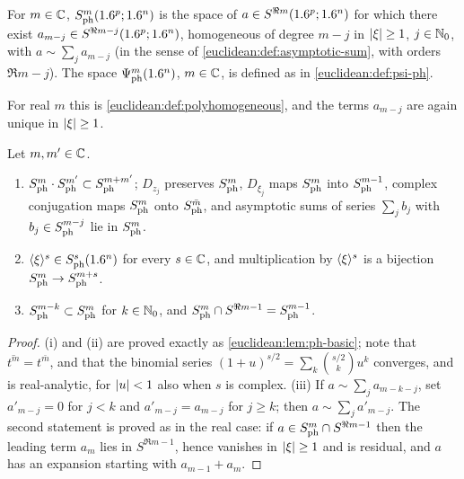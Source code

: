 \begin{definition}\label{euclidean:def:ph-complex}
  For $m\in\mathbb{C}$, $S^{m}_{\mathrm{ph}}(1.6^p;1.6^n)$ is the space of
  $a\in S^{\Re m}(1.6^p;1.6^n)$ for which there exist
  $a_{m-j}\in S^{\Re m-j}(1.6^p;1.6^n)$, homogeneous of degree $m-j$ in
  $\lvert \xi\rvert\ge1$, $j\in\mathbb{N}_0$, with $a\sim\sum_ja_{m-j}$ (in the sense of
  \cref{euclidean:def:asymptotic-sum}, with orders $\Re m-j$). The space
  $\Psi^{m}_{\mathrm{ph}}(1.6^n)$, $m\in\mathbb{C}$, is defined as in
  \cref{euclidean:def:psi-ph}.
\end{definition}

For real $m$ this is \cref{euclidean:def:polyhomogeneous}, and the terms
$a_{m-j}$ are again unique in $\lvert \xi\rvert\ge1$.

\begin{lemma}\label{euclidean:lem:ph-complex}
  Let $m,m'\in\mathbb{C}$.
  \begin{enumerate}[label=\textup{(\roman*)}]
  \item $S^{m}_{\mathrm{ph}}\cdot S^{m'}_{\mathrm{ph}}\subset S^{m+m'}_{\mathrm{ph}}$; $D_{z_j}$ preserves
    $S^{m}_{\mathrm{ph}}$, $D_{\xi_j}$ maps $S^{m}_{\mathrm{ph}}$ into $S^{m-1}_{\mathrm{ph}}$, complex
    conjugation maps $S^{m}_{\mathrm{ph}}$ onto $S^{\bar m}_{\mathrm{ph}}$, and asymptotic sums
    of series $\sum_jb_j$ with $b_j\in S^{m-j}_{\mathrm{ph}}$ lie in $S^{m}_{\mathrm{ph}}$.
  \item $\langle \xi\rangle^s\in S^{s}_{\mathrm{ph}}(1.6^n)$ for every $s\in\mathbb{C}$, and multiplication
    by $\langle \xi\rangle^s$ is a bijection $S^{m}_{\mathrm{ph}}\to S^{m+s}_{\mathrm{ph}}$.
  \item $S^{m-k}_{\mathrm{ph}}\subset S^{m}_{\mathrm{ph}}$ for $k\in\mathbb{N}_0$, and
    $S^{m}_{\mathrm{ph}}\cap S^{\Re m-1}=S^{m-1}_{\mathrm{ph}}$.
  \end{enumerate}
\end{lemma}
\begin{proof}
  (i) and (ii) are proved exactly as \cref{euclidean:lem:ph-basic}; note
  that $\overline{t^m}=t^{\bar m}$, and that the binomial series
  $(1+u)^{s/2}=\sum_k\binom{s/2}ku^k$ converges, and is real-analytic, for
  $\lvert u\rvert<1$ also when $s$ is complex. (iii) If $a\sim\sum_ja_{m-k-j}$, set
  $a'_{m-j}=0$ for $j<k$ and $a'_{m-j}=a_{m-j}$ for $j\ge k$; then
  $a\sim\sum_ja'_{m-j}$. The second statement is proved as in the real case:
  if $a\in S^{m}_{\mathrm{ph}}\cap S^{\Re m-1}$ then the leading term $a_m$ lies in
  $S^{\Re m-1}$, hence vanishes in $\lvert \xi\rvert\ge1$ and is residual, and $a$ has
  an expansion starting with $a_{m-1}+a_m$.
\end{proof}

